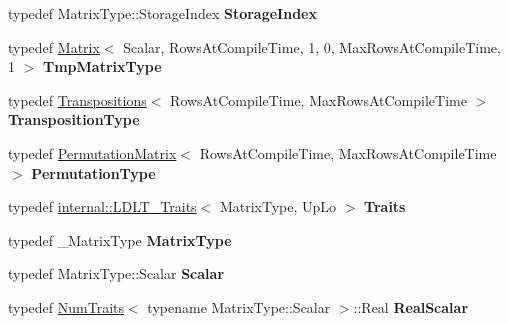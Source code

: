\begin{DoxyCompactItemize}
\item 
\mbox{\label{group___cholesky___module_a8c2f233230eb0b517fd9dde624567bf2}} 
typedef Matrix\+Type\+::\+Storage\+Index {\bfseries Storage\+Index}
\item 
\mbox{\label{group___cholesky___module_aaf014c3e49793fadf342de6f96973166}} 
typedef \hyperlink{group___core___module_class_eigen_1_1_matrix}{Matrix}$<$ Scalar, Rows\+At\+Compile\+Time, 1, 0, Max\+Rows\+At\+Compile\+Time, 1 $>$ {\bfseries Tmp\+Matrix\+Type}
\item 
\mbox{\label{group___cholesky___module_ac3d686008cbd74d1d2721c936f7ff8b1}} 
typedef \hyperlink{group___core___module_class_eigen_1_1_transpositions}{Transpositions}$<$ Rows\+At\+Compile\+Time, Max\+Rows\+At\+Compile\+Time $>$ {\bfseries Transposition\+Type}
\item 
\mbox{\label{group___cholesky___module_a6a901ba1f333313e097ef3aac2164149}} 
typedef \hyperlink{group___core___module_class_eigen_1_1_permutation_matrix}{Permutation\+Matrix}$<$ Rows\+At\+Compile\+Time, Max\+Rows\+At\+Compile\+Time $>$ {\bfseries Permutation\+Type}
\item 
\mbox{\label{group___cholesky___module_a4755ce1400f755d7148cff2872e75d35}} 
typedef \hyperlink{struct_eigen_1_1internal_1_1_l_d_l_t___traits}{internal\+::\+L\+D\+L\+T\+\_\+\+Traits}$<$ Matrix\+Type, Up\+Lo $>$ {\bfseries Traits}
\item 
\mbox{\label{group___cholesky___module_a402092cb89eee4d7bc7502a9eac0d318}} 
typedef \+\_\+\+Matrix\+Type {\bfseries Matrix\+Type}
\item 
\mbox{\label{group___cholesky___module_a4e0935217cce5695a214c85e7ef813df}} 
typedef Matrix\+Type\+::\+Scalar {\bfseries Scalar}
\item 
\mbox{\label{group___cholesky___module_a2fe48d9c6549347a6b5156f2b2724416}} 
typedef \hyperlink{group___core___module_struct_eigen_1_1_num_traits}{Num\+Traits}$<$ typename Matrix\+Type\+::\+Scalar $>$\+::Real {\bfseries Real\+Scalar}

\end{DoxyCompactItemize}
